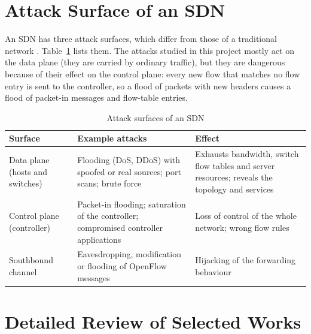 \section{Attack Surface of an SDN}
An SDN has three attack surfaces, which differ from those of a traditional network \cite{bib:kreutz,bib:yan}. Table~\ref{tab:surface} lists them. The attacks studied in this project mostly act on the data plane (they are carried by ordinary traffic), but they are dangerous because of their effect on the control plane: every new flow that matches no flow entry is sent to the controller, so a flood of packets with new headers causes a flood of packet-in messages and flow-table entries.

\begin{table}[htbp]
\centering
\caption{Attack surfaces of an SDN}
\label{tab:surface}
\small
\begin{tabularx}{\textwidth}{|p{2.8cm}|X|X|}
\hline
\textbf{Surface} & \textbf{Example attacks} & \textbf{Effect} \\ \hline
Data plane (hosts and switches) & Flooding (DoS, DDoS) with spoofed or real sources; port scans; brute force & Exhausts bandwidth, switch flow tables and server resources; reveals the topology and services \\ \hline
Control plane (controller) & Packet-in flooding; saturation of the controller; compromised controller applications & Loss of control of the whole network; wrong flow rules \\ \hline
Southbound channel & Eavesdropping, modification or flooding of OpenFlow messages & Hijacking of the forwarding behaviour \\ \hline
\end{tabularx}
\end{table}

\section{Detailed Review of Selected Works}

